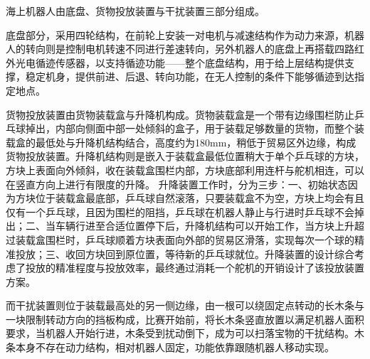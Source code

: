 \documentclass{Robot}
\begin{document}
        海上机器人由底盘、货物投放装置与干扰装置三部分组成。
        \par
        底盘部分，采用四轮结构，在前轮上安装一对电机与减速结构作为动力来源，机器人的转向则是控制电机转速不同进行差速转向，另外机器人的底盘上再搭载四路红外光电循迹传感器，以支持循迹功能——整个底盘结构，用于给上层结构提供支撑，稳定机身，提供前进、后退、转向功能，在无人控制的条件下能够循迹到达指定地点。
        \par
        货物投放装置由货物装载盒与升降机构成。货物装载盒是一个带有边缘围栏防止乒乓球掉出，内部向侧面中部一处倾斜的盒子，用于装载足够数量的货物，而整个装载盒的最低处与升降机结构结合，高度约为180mm，稍低于贸易区外边缘，构成货物投放装置。升降机结构则是嵌入于装载盒最低位置稍大于单个乒乓球的方块，方块上表面向外倾斜，收在装载盒围栏内部，方块底部利用连杆与舵机相连，可以在竖直方向上进行有限度的升降。
        升降装置工作时，分为三步：一、初始状态因为方块位于装载盒最底部，乒乓球自然滚落，只要装载盒不为空，方块上均会有且仅有一个乒乓球，且因为围栏的阻挡，乒乓球在机器人静止与行进时乒乓球不会掉出；二、当车辆行进至合适位置停下后，升降机结构可以开始工作，当方块上升超过装载盒围栏时，乒乓球顺着方块表面向外部的贸易区滑落，实现每次一个球的精准投放；三、收回方块回到原位置，等待新的乒乓球就位。升降装置的设计综合考虑了投放的精准程度与投放效率，最终通过消耗一个舵机的开销设计了该投放装置方案。
        \par
        而干扰装置则位于装载最高处的另一侧边缘，由一根可以绕固定点转动的长木条与一块限制转动方向的挡板构成，比赛开始前，将长木条竖直放置以满足机器人面积要求，当机器人开始行进，木条受到扰动倒下，成为可以扫落宝物的干扰结构。木条本身不存在动力结构，相对机器人固定，功能依靠跟随机器人移动实现。
\end{document}
